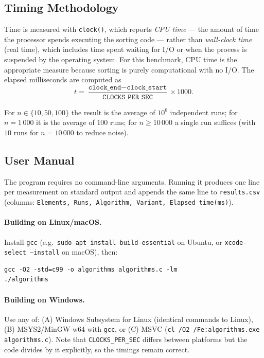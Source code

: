 \documentclass[11pt,a4paper]{article}
\begin{document}
\subsection{Timing Methodology}

Time is measured with \texttt{clock()}, which reports \emph{CPU time} --- the amount of time the processor spends executing the sorting code --- rather than \emph{wall-clock time} (real time), which includes time spent waiting for I/O or when the process is suspended by the operating system. For this benchmark, CPU time is the appropriate measure because sorting is purely computational with no I/O. The elapsed milliseconds are computed as
$$t = \frac{\texttt{clock\_end} - \texttt{clock\_start}}{\texttt{CLOCKS\_PER\_SEC}} \times 1000.$$

For $n \in \{10, 50, 100\}$ the result is the average of $10^6$ independent runs; for $n = 1\,000$ it is the average of $100$ runs; for $n \geq 10\,000$ a single run suffices (with $10$ runs for $n = 10\,000$ to reduce noise).

\subsection{User Manual}
\label{sec:usermanual}

The program requires no command-line arguments. Running it produces one line per measurement on standard output and appends the same line to \texttt{results.csv} (columns: \texttt{Elements, Runs, Algorithm, Variant, Elapsed time(ms)}).

\paragraph{Building on Linux/macOS.}
Install \texttt{gcc} (e.g.\ \texttt{sudo apt install build-essential} on Ubuntu, or \texttt{xcode-select --install} on macOS), then:
\begin{lstlisting}
gcc -O2 -std=c99 -o algorithms algorithms.c -lm
./algorithms
\end{lstlisting}

\paragraph{Building on Windows.}
Use any of: (A) Windows Subsystem for Linux (identical commands to Linux), (B) MSYS2/MinGW-w64 with \texttt{gcc}, or (C) MSVC (\texttt{cl /O2 /Fe:algorithms.exe algorithms.c}). Note that \texttt{CLOCKS\_PER\_SEC} differs between platforms but the code divides by it explicitly, so the timings remain correct.
\end{document}
